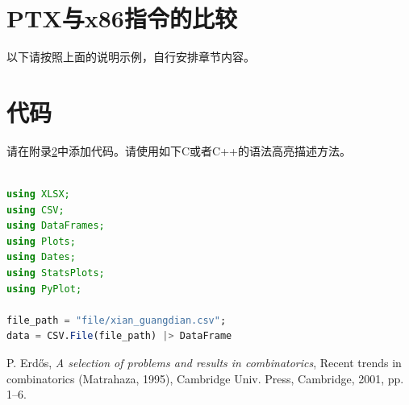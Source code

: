 \documentclass[a4paper]{article}
\begin{document}
\section{PTX与x86指令的比较}\label{ptxvsx86}
以下请按照上面的说明示例，自行安排章节内容。

\appendix
\section{代码}\label{sub:app.code}
请在附录\ref{sub:app.code}中添加代码。请使用如下C或者C++的语法高亮描述方法。
\begin{lstlisting}[language=julia]

using XLSX;
using CSV;
using DataFrames;
using Plots;
using Dates;
using StatsPlots;
using PyPlot;

file_path = "file/xian_guangdian.csv";
data = CSV.File(file_path) |> DataFrame


\end{lstlisting}
\newpage
\begin{thebibliography}{9}
 P. Erd\H os, \emph{A selection of problems and
results in combinatorics}, Recent trends in combinatorics (Matrahaza,
1995), Cambridge Univ. Press, Cambridge, 2001, pp. 1--6.
\end{thebibliography}
\end{document}

